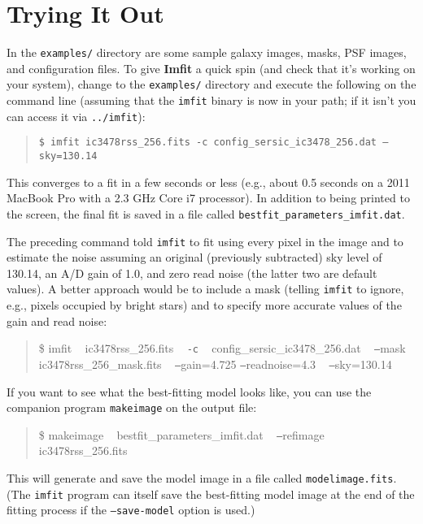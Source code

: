 \documentclass[10pt,a4paper,article]{memoir}
\newcommand{\imfit}{\textbf{Imfit}}
\newcommand{\imfitprog}{\texttt{imfit}}
\newcommand{\makeimage}{\texttt{makeimage}}
\begin{document}
\chapter{Trying It Out}

In the \texttt{examples/} directory are some sample galaxy images, masks, PSF images, and
configuration files. To give \imfit{} a quick spin (and check that it's working on your system), change to the
\texttt{examples/} directory and execute the following on the command line (assuming that
the \imfitprog{} binary is now in your path; if it isn't you can access it via
\texttt{../imfit}):
\begin{quote}
\texttt{\$ imfit ic3478rss\_256.fits \texttt{-c} config\_sersic\_ic3478\_256.dat \texttt{--}sky=130.14}
\end{quote}

This converges to a fit in a few seconds or less (e.g., about 0.5 seconds on a 
2011 MacBook Pro with a 2.3 GHz Core i7 processor). In addition to being printed to
the screen, the final fit is saved in a file called \texttt{bestfit\_parameters\_imfit.dat}.

The preceding command told \imfitprog{} to fit using every pixel in the image and to estimate
the noise assuming an original (previously subtracted) sky level of 130.14, an A/D gain
of 1.0, and zero read noise (the latter two are default values). A better approach would be 
to include a mask (telling \imfitprog{}
to ignore, e.g., pixels occupied by bright stars) and to specify more accurate values
of the gain and read noise:
\begin{quote}
\$ imfit ~ ic3478rss\_256.fits ~ \texttt{-c} ~ config\_sersic\_ic3478\_256.dat ~ \texttt{--}mask ~ ic3478rss\_256\_mask.fits ~ \texttt{--}gain=4.725 \texttt{--}readnoise=4.3 ~ \texttt{--}sky=130.14
\end{quote}

If you want to see what the best-fitting model looks like, you can use the companion program \makeimage{}
on the output file:
\begin{quote}
\$ makeimage ~ bestfit\_parameters\_imfit.dat ~ \texttt{--}refimage ~ ic3478rss\_256.fits
\end{quote}
This will generate and save the model image in a file called \texttt{modelimage.fits}. (The \imfitprog{}
program 
can itself save the best-fitting model image at the end of the fitting process if
the \texttt{--save-model} option is used.)

\end{document}
